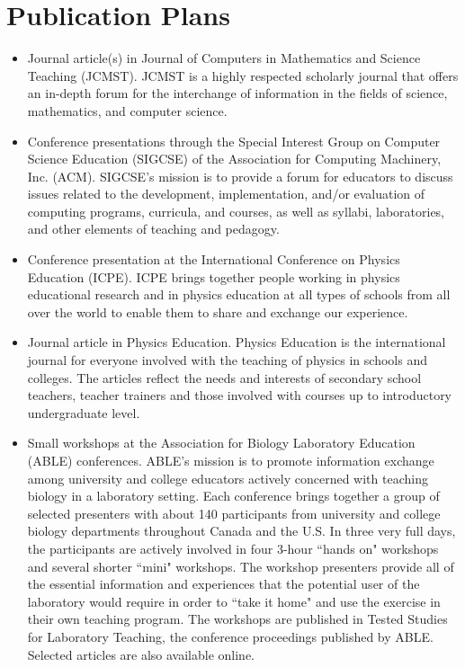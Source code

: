 \documentclass[11pt]{article}
\begin{document}
\section{Publication Plans}

\begin{itemize}
\item Journal article(s) in Journal of Computers in Mathematics and Science Teaching (JCMST). JCMST is a highly respected scholarly journal that offers an in-depth forum for the interchange of information in the fields of science, mathematics, and computer science.
%
\item Conference presentations through the Special Interest Group on Computer Science Education (SIGCSE) of the Association for Computing Machinery, Inc. (ACM). SIGCSE's mission is to provide a forum for educators to discuss issues related to the development, implementation, and/or evaluation of computing programs, curricula, and courses, as well as syllabi, laboratories, and other elements of teaching and pedagogy.
%
\item Conference presentation at the International Conference on Physics Education (ICPE). ICPE brings together people working in physics educational research and in physics education at all types of schools from all over the world to enable them to share and exchange our experience.
%
\item Journal article in Physics Education. Physics Education is the international journal for everyone involved with the teaching of physics in schools and colleges. The articles reflect the needs and interests of secondary school teachers, teacher trainers and those involved with courses up to introductory undergraduate level.
%
\item Small workshops at the Association for Biology Laboratory Education (ABLE) conferences. ABLE's mission is to promote information exchange among university and college educators actively concerned with teaching biology in a laboratory setting. Each conference brings together a group of selected presenters with about 140 participants from university and college biology departments throughout Canada and the U.S. In three very full days, the participants are actively involved in four 3-hour ``hands on" workshops and several shorter ``mini" workshops. The workshop presenters provide all of the essential information and experiences that the potential user of the laboratory would require in order to ``take it home" and use the exercise in their own teaching program. The workshops are published in Tested Studies for Laboratory Teaching, the conference proceedings published by ABLE. Selected articles are also available online. 

\end{itemize}
\end{document}
